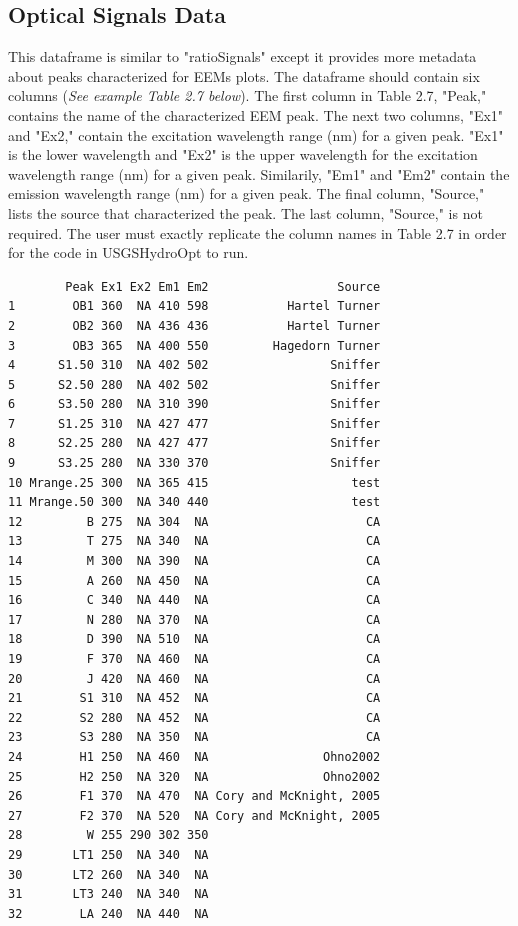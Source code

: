 \documentclass[a4paper,11pt]{article}\usepackage[]{graphicx}\usepackage[]{color}
\makeatletter
\newenvironment{kframe}{%
 \def\at@end@of@kframe{}%
 \ifinner\ifhmode%
  \def\at@end@of@kframe{\end{minipage}}%
  \begin{minipage}{\columnwidth}%
 \fi\fi%
 \def\FrameCommand##1{\hskip\@totalleftmargin \hskip-\fboxsep
 \colorbox{shadecolor}{##1}\hskip-\fboxsep
     \hskip-\linewidth \hskip-\@totalleftmargin \hskip\columnwidth}%
 \MakeFramed {\advance\hsize-\width
   \@totalleftmargin\z@ \linewidth\hsize
   \@setminipage}}%
 {\par\unskip\endMakeFramed%
 \at@end@of@kframe}
\newenvironment{knitrout}{}{} %
\makeatother
\begin{document}
\subsection{Optical Signals Data}
This dataframe is similar to "ratioSignals" except it provides more metadata about peaks characterized for EEMs plots. The dataframe should contain six columns (\emph{See example Table 2.7 below}). The first column in Table 2.7, "Peak," contains the name of the characterized EEM peak. The next two columns, "Ex1" and "Ex2," contain the excitation wavelength range (nm) for a given peak. "Ex1" is the lower wavelength and "Ex2" is the upper wavelength for the excitation wavelength range (nm) for a given peak. Similarily, "Em1" and "Em2" contain the emission wavelength range (nm) for a given peak. The final column, "Source," lists the source that characterized the peak. The last column, "Source," is not required. The user must exactly replicate the column names in Table 2.7 in order for the code in USGSHydroOpt to run.

\begin{knitrout}
\color{fgcolor}\begin{kframe}
\begin{verbatim}
        Peak Ex1 Ex2 Em1 Em2                  Source
1        OB1 360  NA 410 598           Hartel Turner
2        OB2 360  NA 436 436           Hartel Turner
3        OB3 365  NA 400 550         Hagedorn Turner
4      S1.50 310  NA 402 502                 Sniffer
5      S2.50 280  NA 402 502                 Sniffer
6      S3.50 280  NA 310 390                 Sniffer
7      S1.25 310  NA 427 477                 Sniffer
8      S2.25 280  NA 427 477                 Sniffer
9      S3.25 280  NA 330 370                 Sniffer
10 Mrange.25 300  NA 365 415                    test
11 Mrange.50 300  NA 340 440                    test
12         B 275  NA 304  NA                      CA
13         T 275  NA 340  NA                      CA
14         M 300  NA 390  NA                      CA
15         A 260  NA 450  NA                      CA
16         C 340  NA 440  NA                      CA
17         N 280  NA 370  NA                      CA
18         D 390  NA 510  NA                      CA
19         F 370  NA 460  NA                      CA
20         J 420  NA 460  NA                      CA
21        S1 310  NA 452  NA                      CA
22        S2 280  NA 452  NA                      CA
23        S3 280  NA 350  NA                      CA
24        H1 250  NA 460  NA                Ohno2002
25        H2 250  NA 320  NA                Ohno2002
26        F1 370  NA 470  NA Cory and McKnight, 2005
27        F2 370  NA 520  NA Cory and McKnight, 2005
28         W 255 290 302 350                        
29       LT1 250  NA 340  NA                        
30       LT2 260  NA 340  NA                        
31       LT3 240  NA 340  NA                        
32        LA 240  NA 440  NA                        
\end{verbatim}
\end{kframe}
\end{knitrout}
\end{document}
